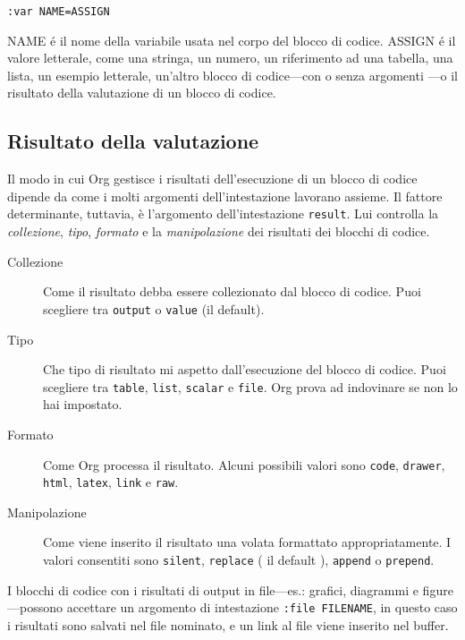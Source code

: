 \documentclass[11pt]{article}
\begin{document}
\begin{verbatim}
:var NAME=ASSIGN
\end{verbatim}


NAME é il nome della variabile usata nel corpo del
blocco di codice. ASSIGN é il valore letterale, come una
stringa, un numero, un riferimento ad una tabella, una lista, un
esempio letterale, un'altro blocco di codice---con o senza argomenti
---o il risultato della valutazione di un blocco di codice.

\subsection*{Risultato della valutazione}
\label{sec:orgc4d3cbb}
Il modo in cui Org gestisce i risultati dell'esecuzione di un blocco
di codice dipende da come i molti argomenti dell'intestazione lavorano
assieme. Il fattore determinante, tuttavia, è l'argomento
dell'intestazione \texttt{result}. Lui controlla la \emph{collezione}, \emph{tipo},
\emph{formato} e la \emph{manipolazione} dei risultati dei blocchi di codice.

\begin{description}
\item[{Collezione}] Come il risultato debba essere collezionato dal blocco di
codice. Puoi scegliere tra \texttt{output} o \texttt{value} (il default).

\item[{Tipo}] Che tipo di risultato mi aspetto dall'esecuzione del blocco di
codice. Puoi scegliere tra \texttt{table}, \texttt{list}, \texttt{scalar} e \texttt{file}. Org
prova ad indovinare se non lo hai impostato.

\item[{Formato}] Come Org processa il risultato. Alcuni possibili valori sono \texttt{code},
\texttt{drawer}, \texttt{html}, \texttt{latex}, \texttt{link} e \texttt{raw}.

\item[{Manipolazione}] Come viene inserito il risultato una volata formattato
appropriatamente. I valori consentiti sono \texttt{silent}, \texttt{replace} ( il
default ), \texttt{append} o \texttt{prepend}.
\end{description}

I blocchi di codice con i risultati di output in file---es.:
grafici, diagrammi e figure---possono accettare un argomento di
intestazione \texttt{:file FILENAME}, in questo caso i risultati sono salvati
nel file nominato, e un link al file viene inserito nel buffer.
\end{document}
